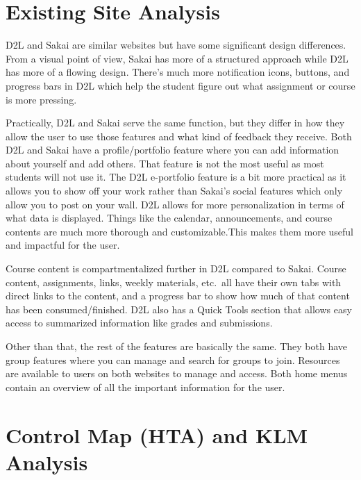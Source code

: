 \documentclass[12pt]{article}
\begin{document}
    \section{Existing Site Analysis}\label{sec:existing-site-analysis}

    D2L and Sakai are similar websites but have some significant design differences.
    From a visual point of view, Sakai has more of a structured approach while D2L has more of a flowing design.
    There’s much more notification icons, buttons, and progress bars in D2L which help the student figure out what assignment or course is more pressing.

    Practically, D2L and Sakai serve the same function, but they differ in how they allow the user to use those features and what kind of feedback they receive.
    Both D2L and Sakai have a profile/portfolio feature where you can add information about yourself and add others.
    That feature is not the most useful as most students will not use it.
    The D2L e-portfolio feature is a bit more practical as it allows you to show off your work rather than Sakai’s social features which only allow you to post on your wall.
    D2L allows for more personalization in terms of what data is displayed.
    Things like the calendar, announcements, and course contents are much more thorough and customizable.This makes them more useful and impactful for the user.

    Course content is compartmentalized further in D2L compared to Sakai.
    Course content, assignments, links, weekly materials, etc.\ all have their own tabs with direct links to the content, and a progress bar to show how much of that content has been consumed/finished.
    D2L also has a Quick Tools section that allows easy access to summarized information like grades and submissions.

    Other than that, the rest of the features are basically the same.
    They both have group features where you can manage and search for groups to join.
    Resources are available to users on both websites to manage and access.
    Both home menus contain an overview of all the important information for the user.


    \section{Control Map (HTA) and KLM Analysis}\label{sec:control-maphta}
\end{document}
